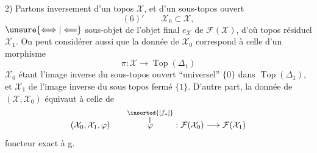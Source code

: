 2) Partons inversement d'un topos $\mathcal X$, et d'un sous-topos ouvert
\[
(6)'\qquad\mathcal X_0\subset\mathcal X,
\]
$\unsure{\Longleftrightarrow|\Longleftarrow}$ sous-objet de l'objet final $e_{\mathcal X}$ de $\mathcal F(\mathcal X)$, d'où topos résiduel $\mathcal X_1$. On peut considérer aussi que la donnée de $\mathcal X_0$ correspond à celle d'un morphisme
\[
\pi:\mathcal X\longrightarrow\operatorname{Top}(\Delta_1)
\]
$\mathcal X_0$ étant l'image inverse du sous-topos ouvert ``universel'' $\{0\}$ dans $\operatorname{Top}(\Delta_1)$, et $\mathcal X_1$ de  l'image inverse du sous topos fermé $\{1\}$.
D'autre part, la donnée de $(\mathcal X,\mathcal X_0)$ équivaut à celle de
\[
(\mathcal X_0,\mathcal X_1,\varphi)\qquad
\overset{\substack{\inserted{[f_*]}\\\Vert}}{\varphi}:\mathcal F(\mathcal X_0)\longrightarrow\mathcal F(\mathcal X_1)
\]
foncteur exact à g. 

